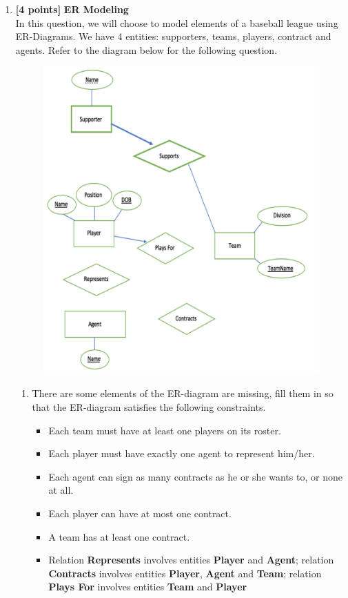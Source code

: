 \documentclass[10pt]{article}
\begin{document}
\begin{enumerate}

	\item \textbf{[4 points]} \textbf{ER Modeling} \\
	      In this question, we will choose to model elements of a baseball league using ER-Diagrams. We have 4 entities:
	      supporters, teams, players, contract and agents. Refer to the diagram below for the following question.
	      \begin{figure}[ht]
		      \centering
		      \includegraphics[width=0.7\linewidth]{pro2}
	      \end{figure}

	      \begin{enumerate}
		      \item There are some elements of the ER-diagram are missing, fill them in so that the ER-diagram satisfies the following constraints.

		            \begin{itemize}
			            \item Each team must have at least one players on its roster.
			            \item Each player must have exactly one agent to represent him/her.
			            \item Each agent can sign as many contracts as he or she wants to, or none at all.
			            \item Each player can have at most one contract.
			            \item A team has at least one contract.
			            \item Relation \textbf{Represents} involves entities \textbf{Player} and \textbf{Agent}; relation \textbf{Contracts} involves
			                  entities \textbf{Player}, \textbf{Agent} and \textbf{Team}; relation \textbf{Plays For} involves entities \textbf{Team} and \textbf{Player}
		            \end{itemize}


\end{enumerate}
\end{enumerate}
\end{document}
